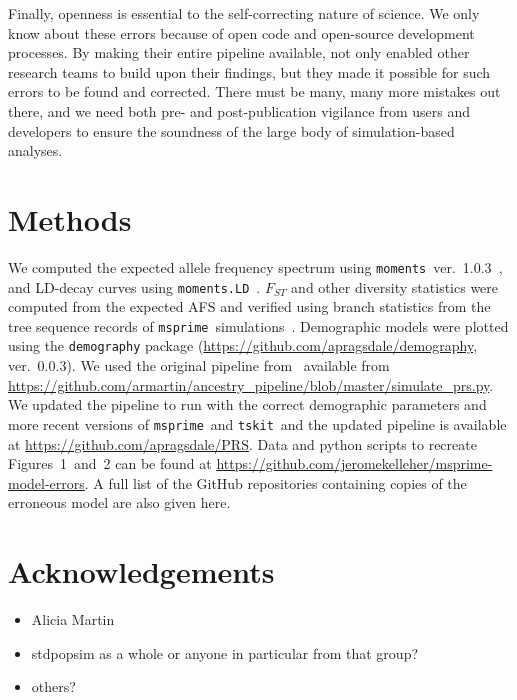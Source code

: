 \documentclass{article}
\newcommand{\msprime}[0]{\texttt{msprime}}
\newcommand{\tskit}[0]{\texttt{tskit}}
\begin{document}
Finally, openness is essential to the self-correcting nature of science.
We only know about these errors because of open code and
open-source development processes. By making their entire pipeline available,
\citet{martin2017human} not only enabled other research teams to build upon their findings,
but they made it possible for such errors to be found and corrected.
There must be many, many more mistakes out there, and we need both
pre- and post-publication vigilance from users and developers to ensure the
soundness of the large body of simulation-based analyses.


\section{Methods}


We computed the expected allele frequency spectrum using
\texttt{moments}~ver.~1.0.3~\citep{jouganous2017inferring}, and LD-decay curves using
\texttt{moments.LD}~\citep{ragsdale2019models}. $F_{ST}$ and other diversity statistics
were computed from the expected AFS and verified using branch statistics from the
tree sequence records of \msprime\ simulations~\citep{ralph2020efficiently}.
Demographic models were plotted using the \texttt{demography} package
(\url{https://github.com/apragsdale/demography}, ver.~0.0.3).
We used the original pipeline from~\citet{martin2017human} available from
\url{https://github.com/armartin/ancestry_pipeline/blob/master/simulate_prs.py}.
We updated the pipeline to run with the correct demographic parameters and more
recent versions of \msprime\ and \tskit\, and the updated pipeline is
available at \url{https://github.com/apragsdale/PRS}.
Data and python scripts to recreate Figures~1~and~2 can be found at
\url{https://github.com/jeromekelleher/msprime-model-errors}.
A full list of the GitHub repositories containing copies of the erroneous
model are also given here.

\section*{Acknowledgements}

\begin{itemize}
\item Alicia Martin
\item stdpopsim as a whole or anyone in particular from that group?
\item others?
\end{itemize}



\end{document}

